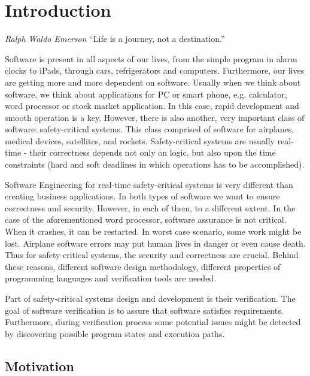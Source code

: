 
\cleardoublepage

\chapter{Introduction}
\label{introduction}

\begin{chapquote}{\textit{Ralph Waldo Emerson}}
``Life is a journey, not a destination.''
\end{chapquote}

Software is present in all aspects of our lives, from the simple program in alarm clocks to iPads, through cars, refrigerators and computers. Furthermore, our lives are getting more and more dependent on software. Usually when we think about software, we think about applications for PC or smart phone, e.g. calculator, word processor or stock market application. In this case, rapid development and smooth operation is a key. However, there is also another, very important class of software: safety-critical systems. This class comprised of software for airplanes, medical devices, satellites, and rockets. Safety-critical systems are usually real-time - their correctness depends not only on logic, but also upon the time constraints (hard and soft deadlines in which operations has to be accomplished).

Software Engineering for real-time safety-critical systems is very different than creating business applications. In both types of software we want to ensure correctness and security. However, in each of them, to a different extent. In the case of the aforementioned word processor, software assurance is not critical. When it crashes, it can be restarted. In worst case scenario, some work might be lost. Airplane software errors may put human lives in danger or even cause death. Thus for safety-critical systems, the security and correctness are crucial. Behind these reasons, different software design methodology, different properties of programming languages and verification tools are needed.

Part of safety-critical systems design and development is their verification. The goal of software verification is to assure that software satisfies requirements. Furthermore, during verification process some potential issues might be detected by discovering possible program states and execution paths.


\section{Motivation}
\label{introduction:motivation}

